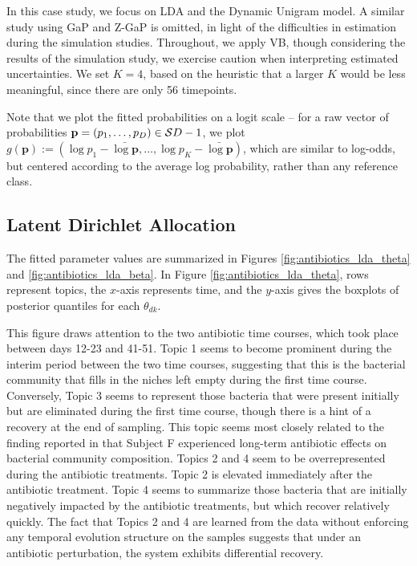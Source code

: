 \documentclass[oupdraft]{bio}
\begin{document}
In this case study, we focus on LDA and the Dynamic Unigram model. A similar
study using GaP and Z-GaP is omitted, in light of the difficulties in estimation
during the simulation studies. Throughout, we apply VB, though considering the
results of the simulation study, we exercise caution when interpreting estimated
uncertainties. We set $K = 4$, based on the heuristic that a larger $K$ would be
less meaningful, since there are only 56 timepoints.

Note that we plot the fitted probabilities on a logit scale -- for a raw vector
of probabilities $\mathbf{p} = \left(p_{1}, \dots, p_{D}\right) \in
\mathcal{S}{D - 1}$, we plot $g\left(\mathbf{p}\right) := \left(\log p_{1} -
\bar{\log \mathbf{p}}, \dots, \log p_{K} - \bar{\log
  \mathbf{p}}\right)$, which are similar to log-odds, but centered according to
the average log probability, rather than any reference class.

\subsection{Latent Dirichlet Allocation}
\label{sec:antibiotics_lda}

The fitted parameter values are summarized in Figures
\ref{fig:antibiotics_lda_theta} and \ref{fig:antibiotics_lda_beta}.
In Figure \ref{fig:antibiotics_lda_theta}, rows represent topics, the $x$-axis
represents time, and the $y$-axis gives the boxplots of posterior quantiles for
each $\theta_{dk}$.

This figure draws attention to the two antibiotic time courses, which took place
between days 12-23 and 41-51. Topic 1 seems to become prominent during the
interim period between the two time courses, suggesting that this is the
bacterial community that fills in the niches left empty during the first time
course. Conversely, Topic 3 seems to represent those bacteria that were present
initially but are eliminated during the first time course, though there is a
hint of a recovery at the end of sampling. This topic seems most closely related
to the finding reported in \cite{dethlefsen2011incomplete} that Subject F
experienced long-term antibiotic effects on bacterial community composition.
Topics 2 and 4 seem to be overrepresented during the antibiotic treatments.
Topic 2 is elevated immediately after the antibiotic treatment. Topic 4 seems to
summarize those bacteria that are initially negatively impacted by the
antibiotic treatments, but which recover relatively quickly. The fact that
Topics 2 and 4 are learned from the data without enforcing any temporal
evolution structure on the samples suggests that under an antibiotic
perturbation, the system exhibits differential recovery.
\end{document}

